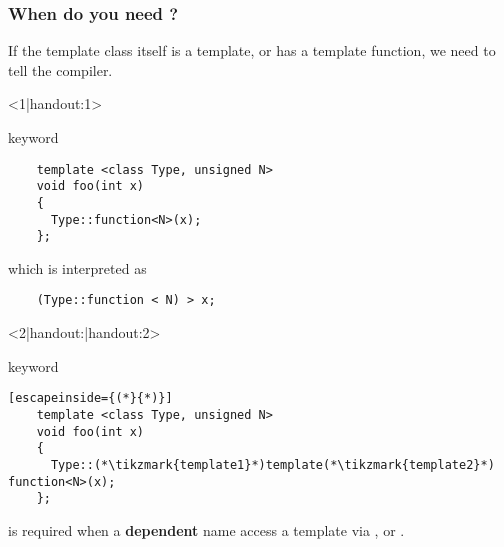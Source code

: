 \documentclass[11pt,a4paper,dvipsnames,usenames]{beamer}
\begin{document}
\begin{frame}[fragile]
  \frametitle{When do you need ?}

  \vfill

  If the template class itself is a template, or has a template function, we need to tell the compiler.

  \vfill

  \begin{onlyenv}<1|handout:1>
  \begin{exampleblock}{ keyword}
    \begin{lstlisting}
    template <class Type, unsigned N>
    void foo(int x)
    {
      Type::function<N>(x);
    };
    \end{lstlisting}
  \end{exampleblock}

  \vfill

  which is interpreted as

  \begin{lstlisting}
    (Type::function < N) > x;
  \end{lstlisting}
  \end{onlyenv}

  \begin{onlyenv}<2|handout:|handout:2>
  \begin{exampleblock}{ keyword}
    \begin{lstlisting}[escapeinside={(*}{*)}]
    template <class Type, unsigned N>
    void foo(int x)
    {
      Type::(*\tikzmark{template1}*)template(*\tikzmark{template2}*) function<N>(x);
    };
    \end{lstlisting}
  \end{exampleblock}


  \vfill

   is required when a \textbf{dependent} name access a template via , \inline{->} or \inline{::}.
  \end{onlyenv}

  \vfill

\end{frame}
\end{document}
